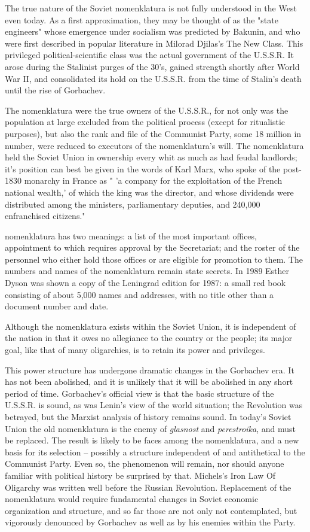 The true nature of the Soviet nomenklatura is not fully understood in the West even today. As a first approximation, they may be thought of as the "state engineers" whose emergence under socialism was predicted by Bakunin, and who were first described in popular literature in Milorad Djilas's The New Class. This privileged political-scientific class was the actual government of the U.S.S.R. It arose during the Stalinist purges of the 30's, gained strength shortly after World War II, and consolidated its hold on the U.S.S.R. from the time of Stalin's death until the rise of Gorbachev.

The nomenklatura were the true owners of the U.S.S.R., for not only was the population at large excluded from the political process (except for ritualistic purposes), but also the rank and file of the Communist Party, some 18 million in number, were reduced to executors of the nomenklatura's will. The nomenklatura held the Soviet Union in ownership every whit as much as had feudal landlords; it's position can best be given in the words of Karl Marx, who spoke of the post-1830 monarchy in France as " 'a company for the exploitation of the French national wealth,' of which the king was the director, and whose dividends were distributed among the ministers, parliamentary deputies, and 240,000 enfranchised citizens."

nomenklatura has two meanings: a list of the most important offices, appointment to which requires approval by the Secretariat; and the roster of the personnel who either hold those offices or are eligible for promotion to them. The numbers and names of the nomenklatura remain state secrets. In 1989 Esther Dyson was shown a copy of the Leningrad edition for 1987: a small red book consisting of about 5,000 names and addresses, with no title other than a document number and date.

Although the nomenklatura exists within the Soviet Union, it is independent of the nation in that it owes no allegiance to the country or the people; its major goal, like that of many oligarchies, is to retain its power and privileges.

This power structure has undergone dramatic changes in the Gorbachev era. It has not been abolished, and it is unlikely that it will be abolished in any short period of time. Gorbachev's official view is that the basic structure of the U.S.S.R. is sound, as was Lenin's view of the world situation; the Revolution was betrayed, but the Marxist analysis of history remains sound. In today's Soviet Union the old nomenklatura is the enemy of \textit{glasnost} and \textit{perestroika}, and must be replaced. The result is likely to be faces among the nomenklatura, and a new basis for its selection -- possibly a structure independent of and antithetical to the Communist Party. Even so, the phenomenon will remain, nor should anyone familiar with political history be surprised by that. Michels's Iron Law Of Oligarchy was written well before the Russian Revolution. Replacement of the nomenklatura would require fundamental changes in Soviet economic organization and structure, and so far those are not only not contemplated, but vigorously denounced by Gorbachev as well as by his enemies within the Party.

